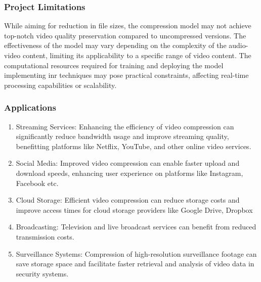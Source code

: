 \documentclass{ioereport}
\begin{document}
        \subsubsection{Project Limitations}
        While aiming for reduction in file sizes, the compression model may not achieve top-notch video quality preservation compared to uncompressed versions. The effectiveness of the model may vary depending on the complexity of the audio-video content, limiting its applicability to a specific range of video content. The computational resources required for training and deploying the model implementing \gls{inr} techniques may pose practical constraints, affecting real-time processing capabilities or scalability.
        \subsubsection{Applications}
        \begin{enumerate}[label=\textbf{\roman*.}]
            \item Streaming Services: Enhancing the efficiency of video compression can significantly reduce bandwidth usage and improve streaming quality, benefitting platforms like Netflix, YouTube, and other online video services.
            \item Social Media: Improved video compression can enable faster upload and download speeds, enhancing user experience on platforms like Instagram, Facebook etc.
            \item Cloud Storage: Efficient video compression can reduce storage costs and improve access times for cloud storage providers like Google Drive, Dropbox
            \item Broadcasting: Television and live broadcast services can benefit from reduced transmission costs.
            \item Surveillance Systems: Compression of high-resolution surveillance footage can save storage space and facilitate faster retrieval and analysis of video data in security systems.
        \end{enumerate}
            
    \pagebreak
    
\end{document}
